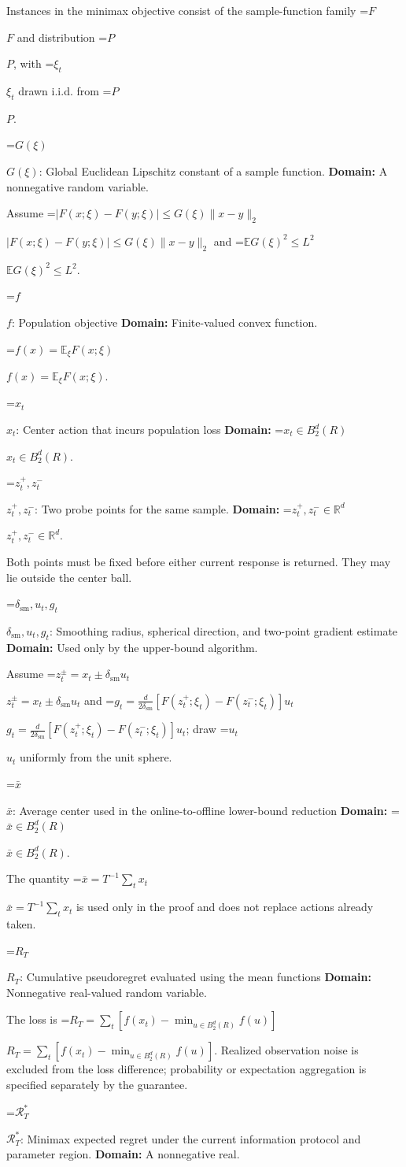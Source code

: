 \documentclass[10pt,a4paper]{article}
\newcommand{\AtlasMath}[1]{\par\begingroup\centering\setbox0=\hbox{$\displaystyle #1$}\ifdim\wd0>1.4\linewidth\typeout{ATLAS WIDE FORMULA: \the\wd0}\fi\ifdim\wd0>\linewidth\resizebox{\linewidth}{!}{\box0}\else\box0\fi\par\endgroup}
\newcommand{\AtlasInlineMath}[1]{\begingroup\setbox0=\hbox{$#1$}\ifdim\wd0>.4\linewidth\endgroup\AtlasMath{#1}\else\endgroup$#1$\fi}
\begin{document}
Instances in the minimax objective consist of the sample-function family \AtlasInlineMath{F} and distribution \AtlasInlineMath{P}, with \AtlasInlineMath{\xi_t} drawn i.i.d. from \AtlasInlineMath{P}.

\AtlasInlineMath{G(\xi)}: Global Euclidean Lipschitz constant of a sample function. \textbf{Domain:} A nonnegative random variable.

Assume \AtlasInlineMath{|F(x;\xi)-F(y;\xi)|\le G(\xi)\|x-y\|_2} and \AtlasInlineMath{\mathbb E G(\xi)^2\le L^2}.

\AtlasInlineMath{f}: Population objective \textbf{Domain:} Finite-valued convex function.

\AtlasInlineMath{f(x)=\mathbb E_\xi F(x;\xi)}.

\AtlasInlineMath{x_t}: Center action that incurs population loss \textbf{Domain:} \AtlasInlineMath{x_t\in B_2^d(R)}.

\AtlasInlineMath{z_t^+,z_t^-}: Two probe points for the same sample. \textbf{Domain:} \AtlasInlineMath{z_t^+,z_t^-\in\mathbb R^d}.

Both points must be fixed before either current response is returned. They may lie outside the center ball.

\AtlasInlineMath{\delta_{\mathrm{sm}},u_t,g_t}: Smoothing radius, spherical direction, and two-point gradient estimate \textbf{Domain:} Used only by the upper-bound algorithm.

Assume \AtlasInlineMath{z_t^\pm=x_t\pm\delta_{\mathrm{sm}}u_t} and \AtlasInlineMath{g_t=\frac d{2\delta_{\mathrm{sm}}}[F(z_t^+;\xi_t)-F(z_t^-;\xi_t)]u_t}; draw \AtlasInlineMath{u_t} uniformly from the unit sphere.

\AtlasInlineMath{\bar x}: Average center used in the online-to-offline lower-bound reduction \textbf{Domain:} \AtlasInlineMath{\bar x\in B_2^d(R)}.

The quantity \AtlasInlineMath{\bar x=T^{-1}\sum_tx_t} is used only in the proof and does not replace actions already taken.

\AtlasInlineMath{R_T}: Cumulative pseudoregret evaluated using the mean functions \textbf{Domain:} Nonnegative real-valued random variable.

The loss is \AtlasInlineMath{R_T=\sum_t[f(x_t)-\min_{u\in B_2^d(R)}f(u)]}. Realized observation noise is excluded from the loss difference; probability or expectation aggregation is specified separately by the guarantee.

\AtlasInlineMath{\mathcal R_T^*}: Minimax expected regret under the current information protocol and parameter region. \textbf{Domain:} A nonnegative real.
\end{document}
